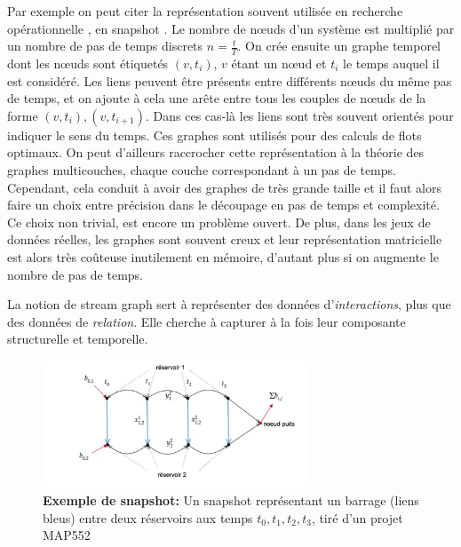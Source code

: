 \documentclass[11pt,a4paper]{article}
\theoremstyle{definition}
\theoremstyle{remark}
\theoremstyle{remark}
\def \stg {stream graph}
\begin{document}
Par exemple on peut citer la représentation souvent utilisée en recherche opérationnelle \cite{map,netflow}, en \og snapshot \fg{}. Le nombre de n\oe{}uds d'un système est multiplié par un nombre de pas de temps discrets $n=\frac{t}{T}$. On crée ensuite un graphe temporel dont les n\oe{}uds sont étiquetés $(v,t_i)$, $v$ étant un n\oe{}ud et $t_i$ le temps auquel il est considéré. Les liens peuvent être présents entre différents n\oe{}uds du même pas de temps, et on ajoute à cela une arête entre tous les couples de n\oe{}uds de la forme $(v,t_i),(v,t_{i+1})$. 
Dans ces cas-là les liens sont très souvent orientés pour indiquer le sens du temps. Ces graphes sont utilisés pour des calculs de flots optimaux. On peut d'ailleurs raccrocher cette représentation à la théorie des graphes multicouches, chaque couche correspondant à un pas de temps\cite{mlkiv}. Cependant, cela conduit à avoir des graphes de très grande taille et il faut alors faire un choix entre précision dans le découpage en pas de temps et complexité. Ce choix non trivial, est encore un problème ouvert\cite{dtnontrivial,dtnontrivial2}. De plus, dans les jeux de données réelles, les graphes sont souvent creux et leur représentation matricielle est alors très coûteuse inutilement en mémoire, d'autant plus si on augmente le nombre de pas de temps.


La notion de \stg{} sert à représenter des données d'\textit{interactions}, plus que des données de \textit{relation}. Elle cherche à capturer à la fois leur composante structurelle et temporelle. 

\begin{figure}
\centering
	\includegraphics[width=0.7\textwidth]{snapshot.JPG}
	\caption{\textbf{Exemple de snapshot:} Un \og snapshot \fg{} représentant un barrage (liens bleus) entre deux réservoirs aux temps $t_0,t_1,t_2,t_3$, tiré d'un projet MAP552}
\end{figure}



\end{document}
